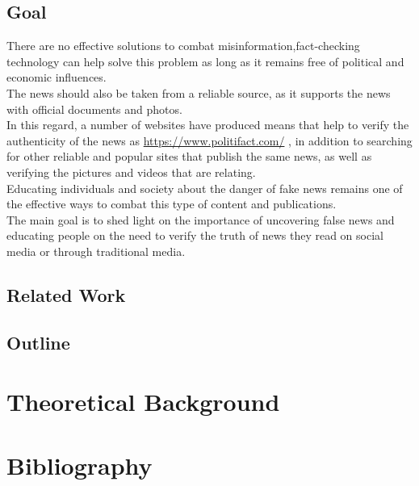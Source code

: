 \documentclass[12pt, letterpaper, twoside]{article}
\begin{document}
\subsection{Goal}
There are no effective solutions to combat misinformation,fact-checking technology can help solve this problem as long as it remains free of political and economic influences.\\
The news should also be taken from a reliable source, as it supports the news with official documents and photos.\\
In this regard, a number of websites have produced means that help to verify the authenticity of the news as \url{https://www.politifact.com/} , in addition to searching for other reliable and popular sites that publish the same news, as well as verifying the pictures and videos that are relating.\\
Educating individuals and society about the danger of fake news remains one of the effective ways to combat this type of content and publications.\\
The main goal is to shed light on the importance of uncovering false news and educating people on the need to verify the truth of news they read on social media or through traditional media.\\
\subsection{Related Work}
\subsection{Outline}

\section{Theoretical Background}
\section{Bibliography}
\end{document}
